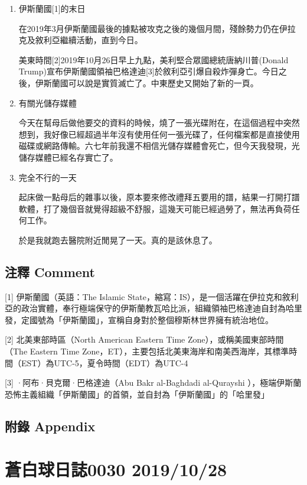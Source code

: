 \documentclass[a5paper, 12pt
]{book}
\begin{document}
\begin{enumerate}
\def\labelenumi{\arabic{enumi}.}
\item
  伊斯蘭國{[}1{]}的末日

  在2019年3月伊斯蘭國最後的據點被攻克之後的幾個月間，殘餘勢力仍在伊拉克及敘利亞繼續活動，直到今日。

  美東時間{[}2{]}2019年10月26日早上九點，美利堅合眾國總統唐納川普(Donald
  Trump)宣布伊斯蘭國領袖巴格達迪{[}3{]}於敘利亞引爆自殺炸彈身亡。今日之後，伊斯蘭國可以說是實質滅亡了。中東歷史又開始了新的一頁。
\item
  有關光儲存媒體

  今天在幫母后做他要交的資料的時候，燒了一張光碟附在，在這個過程中突然想到，我好像已經超過半年沒有使用任何一張光碟了，任何檔案都是直接使用磁碟或網路傳輸。六七年前我還不相信光儲存媒體會死亡，但今天我發現，光儲存媒體已經名存實亡了。
\item
  完全不行的一天

  起床做一點母后的雜事以後，原本要來修改禮拜五要用的譜，結果一打開打譜軟體，打了幾個音就覺得超級不舒服，這幾天可能已經過勞了，無法再負荷任何工作。

  於是我就跑去醫院附近閒晃了一天。真的是該休息了。
\end{enumerate}

\hypertarget{ux6ce8ux91cb-comment-22}{%
\subsection{注釋 Comment}\label{ux6ce8ux91cb-comment-22}}

{[}1{]} 伊斯蘭國（英語：The Islamic State，縮寫：IS），是一個活躍在伊拉克和敘利亞的政治實體，奉行極端保守的伊斯蘭教瓦哈比派，組織領袖巴格達迪自封為哈里發，定國號為「伊斯蘭國」，宣稱自身對於整個穆斯林世界擁有統治地位。

{[}2{]} 北美東部時區（North American Eastern Time
Zone），或稱美國東部時間（The Eastern Time
Zone，ET），主要包括北美東海岸和南美西海岸，其標準時間（EST）為UTC-5，夏令時間（EDT）為UTC-4

{[}3{]}
·阿布·貝克爾·巴格達迪（‎Abu Bakr al-Baghdadi al-Qurayshi ），極端伊斯蘭恐怖主義組織「伊斯蘭國」的首領，並自封為「伊斯蘭國」的「哈里發」

\hypertarget{ux9644ux9304-appendix-21}{%
\subsection{附錄 Appendix}\label{ux9644ux9304-appendix-21}}

\hypertarget{ux84bcux767dux7403ux65e5ux8a8c0030-20191028}{%
\section{蒼白球日誌0030
2019/10/28}\label{ux84bcux767dux7403ux65e5ux8a8c0030-20191028}}
\end{document}
